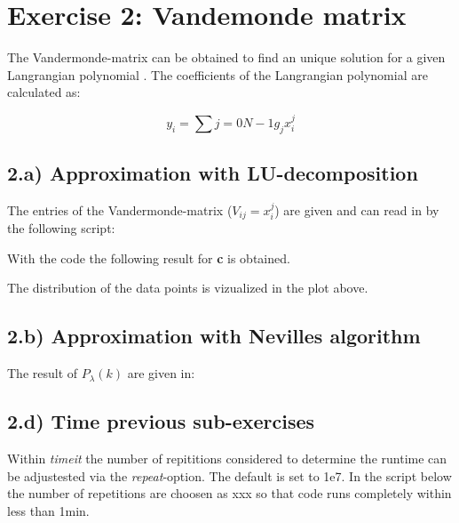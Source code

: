 \section{Exercise 2: Vandemonde matrix}

The Vandermonde-matrix can be obtained to find an unique solution for a given  Langrangian polynomial .
The coefficients of the Langrangian polynomial are calculated as:

\begin{equation}
	y_i = \sum{j=0}{N-1} g_j x_i^j
\end{equation}

\subsection{2.a) Approximation with LU-decomposition}

The entries of the Vandermonde-matrix ($V_{ij} = x_i^j$) are given and can read in by the following script:
 


With the code the following result for \textbf{c} is obtained.



The distribution of the data points is vizualized in the plot above.

\subsection{2.b) Approximation with Nevilles algorithm}

The result of $P_{\lambda}(k)$ are given in:



\subsection{2.d) Time previous sub-exercises}

Within \textit{timeit} the number of repititions considered to determine the runtime can be adjustested via the \textit{repeat}-option. The default is set to 1e7. In the script below the number of repetitions are choosen as xxx so that code runs completely within less than 1min.


